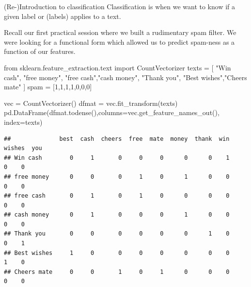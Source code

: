 \documentclass[
  10pt,
  ignorenonframetext,
  aspectratio=169]{beamer}
\newenvironment{Shaded}{\begin{snugshade}}{\end{snugshade}}
\newcommand{\DecValTok}[1]{\textcolor[rgb]{0.86,0.86,0.80}{#1}}
\newcommand{\ImportTok}[1]{\textcolor[rgb]{0.80,0.80,0.80}{#1}}
\newcommand{\NormalTok}[1]{\textcolor[rgb]{0.80,0.80,0.80}{#1}}
\newcommand{\OperatorTok}[1]{\textcolor[rgb]{0.94,0.94,0.82}{#1}}
\newcommand{\StringTok}[1]{\textcolor[rgb]{0.80,0.58,0.58}{#1}}
\begin{document}
\begin{frame}[fragile]{(Re-)Introduction to classification}
\protect\hypertarget{re-introduction-to-classification}{}
Classification is when we want to know if a given label or (labels)
applies to a text.

Recall our first practical session where we built a rudimentary spam
filter. We were looking for a functional form which allowed us to
predict spam-ness as a function of our features.

\medskip
\scriptsize

\begin{Shaded}
\begin{Highlighting}[]
\ImportTok{from}\NormalTok{ sklearn.feature\_extraction.text }\ImportTok{import}\NormalTok{ CountVectorizer}
\NormalTok{texts }\OperatorTok{=}\NormalTok{ [}
    \StringTok{"Win cash"}\NormalTok{, }\StringTok{"free money"}\NormalTok{, }\StringTok{"free cash"}\NormalTok{,}\StringTok{"cash money"}\NormalTok{,}
    \StringTok{"Thank you"}\NormalTok{, }\StringTok{"Best wishes"}\NormalTok{,}\StringTok{"Cheers mate"}
\NormalTok{]}
\NormalTok{spam }\OperatorTok{=}\NormalTok{ [}\DecValTok{1}\NormalTok{,}\DecValTok{1}\NormalTok{,}\DecValTok{1}\NormalTok{,}\DecValTok{1}\NormalTok{,}\DecValTok{0}\NormalTok{,}\DecValTok{0}\NormalTok{,}\DecValTok{0}\NormalTok{]}

\NormalTok{vec }\OperatorTok{=}\NormalTok{ CountVectorizer()}
\NormalTok{dfmat }\OperatorTok{=}\NormalTok{ vec.fit\_transform(texts)}
\NormalTok{pd.DataFrame(dfmat.todense(),columns}\OperatorTok{=}\NormalTok{vec.get\_feature\_names\_out(), index}\OperatorTok{=}\NormalTok{texts)}
\end{Highlighting}
\end{Shaded}

\begin{verbatim}
##              best  cash  cheers  free  mate  money  thank  win  wishes  you
## Win cash        0     1       0     0     0      0      0    1       0    0
## free money      0     0       0     1     0      1      0    0       0    0
## free cash       0     1       0     1     0      0      0    0       0    0
## cash money      0     1       0     0     0      1      0    0       0    0
## Thank you       0     0       0     0     0      0      1    0       0    1
## Best wishes     1     0       0     0     0      0      0    0       1    0
## Cheers mate     0     0       1     0     1      0      0    0       0    0
\end{verbatim}
\end{frame}
\end{document}
